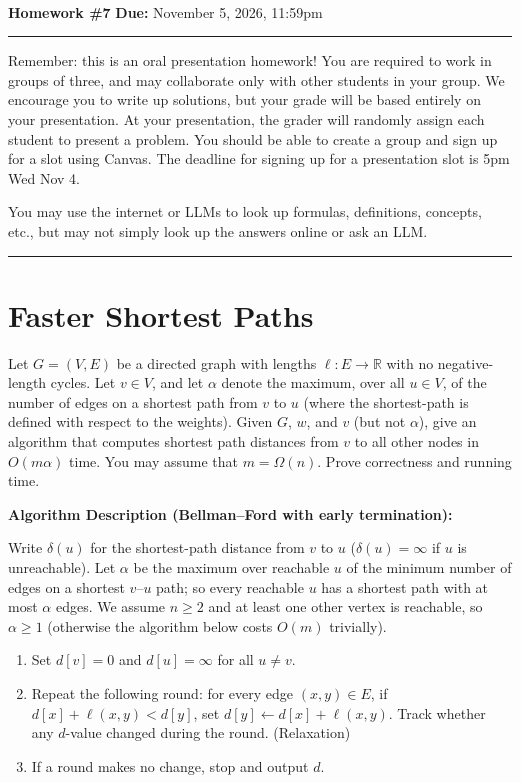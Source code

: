 \documentclass[11pt]{article}
\newcommand{\R}{\ensuremath{\mathbb R}}
\begin{document}
\\ 
{{\bf Homework \#7}} \hfill {{\bf Due:} November 5, 2026, 11:59pm} \\
\rule[0.1in]{\textwidth}{0.4pt}

Remember: this is an oral presentation homework! You are required to work in groups of three, and may collaborate only with other students in your group. 
We encourage you to write up solutions, but your grade will be based entirely on your presentation. 
At your presentation, the grader will randomly assign each student to present a problem. 
You should be able to create a group and sign up for a slot using Canvas. The deadline for signing up for a presentation slot is 5pm Wed Nov 4.

You may use the internet or LLMs to look up formulas, definitions, concepts, etc., but may not simply look up the answers online or ask an LLM.  

\noindent \rule[0.1in]{\textwidth}{0.4pt}

\section{Faster Shortest Paths}

Let $G = (V, E)$ be a directed graph with lengths $\ell : E \rightarrow \R$ with no negative-length cycles. 
Let $v \in V$, and let $\alpha$ denote the maximum, over all $u \in V$, of the number of edges on a shortest path from $v$ to $u$ 
(where the shortest-path is defined with respect to the weights).  Given $G$, $w$, and $v$ (but not $\alpha$), 
give an algorithm that computes shortest path distances from $v$ to all other nodes in $O(m \alpha)$ time. You may assume that $m = \Omega(n)$. 
Prove correctness and running time.

\bigskip

\textbf{Algorithm Description (Bellman--Ford with early termination):}

Write $\delta(u)$ for the shortest-path distance from $v$ to $u$ ($\delta(u) = \infty$ if $u$ is unreachable). 
Let $\alpha$ be the maximum over reachable $u$ of the minimum number of edges on a shortest $v$--$u$ path; 
so every reachable $u$ has a shortest path with at most $\alpha$ edges. We assume $n \ge 2$ and at least one other vertex is reachable, 
so $\alpha \ge 1$ (otherwise the algorithm below costs $O(m)$ trivially).

\begin{enumerate}
  \item Set $d[v] = 0$ and $d[u] = \infty$ for all $u \neq v$.
  \item Repeat the following round: for every edge $(x,y) \in E$, if $d[x] + \ell(x,y) < d[y]$, set $d[y] \gets d[x] + \ell(x,y)$. 
  Track whether any $d$-value changed during the round. (Relaxation)
  \item If a round makes no change, stop and output $d$.
\end{enumerate}
\end{document}
